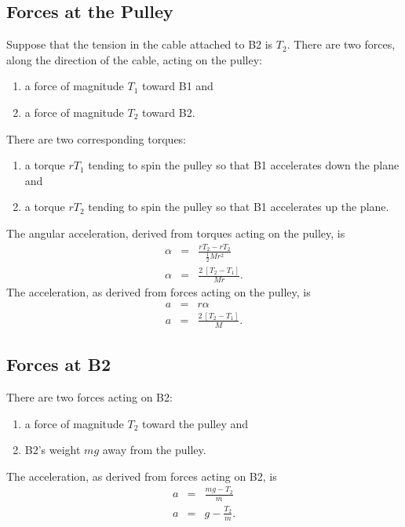 \documentclass[twocolumn]{article}
\begin{document}
\subsection{Forces at the Pulley}

Suppose that the tension in the cable attached to B2 is $T_2$. There are two
forces, along the direction of the cable, acting on the pulley:
\begin{enumerate}
   \item a force of magnitude $T_1$ toward B1 and
   \item a force of magnitude $T_2$ toward B2.
\end{enumerate}
There are two corresponding torques:
\begin{enumerate}
   \item a torque $r T_1$ tending to spin the pulley so that B1 accelerates
      down the plane and
   \item a torque $r T_2$ tending to spin the pulley so that B1 accelerates up
      the plane.
\end{enumerate}
The angular acceleration, derived from torques acting on the pulley, is
\begin{eqnarray}
   \nonumber
   \alpha &=& \frac{r T_2 - r T_2}{\tfrac{1}{2} M r^2}\\
   \alpha &=& \frac{2 \: [T_2 - T_1]}{M r}.
\end{eqnarray}
The acceleration, as derived from forces acting on the pulley, is
\begin{eqnarray}
   \nonumber
   a &=& r \alpha\\
   a &=& \frac{2 \: [T_2 - T_1]}{M}.
   \label{eq:pulley}
\end{eqnarray}

\subsection{Forces at B2}

There are two forces acting on B2:
\begin{enumerate}
   \item a force of magnitude $T_2$ toward the pulley and
   \item B2's weight $mg$ away from the pulley.
\end{enumerate}
The acceleration, as derived from forces acting on B2, is
\begin{eqnarray}
   \nonumber
   a &=& \frac{mg - T_2}{m}\\
   a &=& g - \frac{T_2}{m}.
   \label{eq:B2}
\end{eqnarray}
\end{document}
